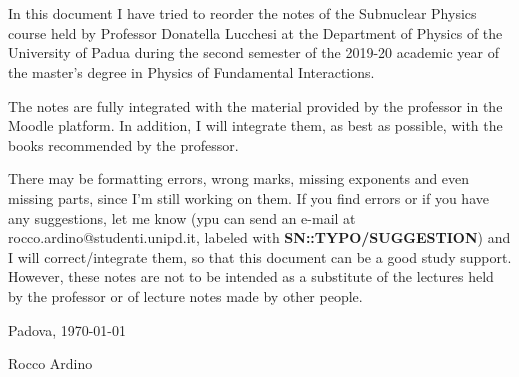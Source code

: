 \chapter*{}
\noindent In this document I have tried to reorder the notes of the Subnuclear Physics course held by Professor Donatella Lucchesi at the Department of Physics of the University of Padua during the second semester of the 2019-20 academic year of the master's degree in Physics of Fundamental Interactions.

The notes are fully integrated with the material provided by the professor in the Moodle platform. In addition, I will integrate them, as best as possible, with the books recommended by the professor.

There may be formatting errors, wrong marks, missing exponents and even missing parts, since I'm still working on them. If you find errors or if you have any suggestions, let me know (ypu can send an e-mail at rocco.ardino@studenti.unipd.it, labeled with \textbf{SN::TYPO/SUGGESTION}) and I will correct/integrate them, so that this document can be a good study support. However, these notes are not to be intended as a substitute of the lectures held by the professor or of lecture notes made by other people.

\vspace{1cm}
\noindent \hfill Padova, \today

\hfill Rocco Ardino
